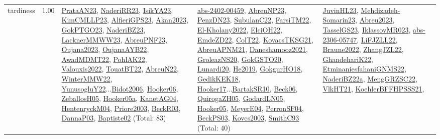 {\begin{longtable}{p{3cm}r>{\raggedright\arraybackslash}p{6cm}>{\raggedright\arraybackslash}p{6cm}>{\raggedright\arraybackslash}p{8cm}}
\index{tardiness}\index{Concepts!tardiness}tardiness &  1.00 & \hyperref[detail:PrataAN23]{PrataAN23}, \hyperref[detail:NaderiRR23]{NaderiRR23}, \hyperref[detail:IsikYA23]{IsikYA23}, \hyperref[detail:KimCMLLP23]{KimCMLLP23}, \hyperref[detail:AlfieriGPS23]{AlfieriGPS23}, \hyperref[detail:Akan2023]{Akan2023}, \hyperref[detail:GokPTGO23]{GokPTGO23}, \hyperref[detail:NaderiBZ23]{NaderiBZ23}, \hyperref[detail:LacknerMMWW23]{LacknerMMWW23}, \hyperref[detail:AbreuPNF23]{AbreuPNF23}, \hyperref[detail:Oujana2023]{Oujana2023}, \hyperref[detail:OujanaAYB22]{OujanaAYB22}, \hyperref[detail:AwadMDMT22]{AwadMDMT22}, \hyperref[detail:PohlAK22]{PohlAK22}, \hyperref[detail:Valouxis2022]{Valouxis2022}, \hyperref[detail:TouatBT22]{TouatBT22}, \hyperref[detail:AbreuN22]{AbreuN22}, \hyperref[detail:WinterMMW22]{WinterMMW22}, \hyperref[detail:YunusogluY22]{YunusogluY22}...\hyperref[detail:Bidot2006]{Bidot2006}, \hyperref[detail:Hooker06]{Hooker06}, \hyperref[detail:ZeballosH05]{ZeballosH05}, \hyperref[detail:Hooker05a]{Hooker05a}, \hyperref[detail:KanetAG04]{KanetAG04}, \hyperref[detail:HentenryckM04]{HentenryckM04}, \hyperref[detail:Priore2003]{Priore2003}, \hyperref[detail:BeckR03]{BeckR03}, \hyperref[detail:DannaP03]{DannaP03}, \hyperref[detail:Baptiste02]{Baptiste02} (Total: 83) & \hyperref[detail:abs-2402-00459]{abs-2402-00459}, \hyperref[detail:AbreuNP23]{AbreuNP23}, \hyperref[detail:PenzDN23]{PenzDN23}, \hyperref[detail:SubulanC22]{SubulanC22}, \hyperref[detail:FarsiTM22]{FarsiTM22}, \hyperref[detail:El-Kholany2022]{El-Kholany2022}, \hyperref[detail:ElciOH22]{ElciOH22}, \hyperref[detail:EmdeZD22]{EmdeZD22}, \hyperref[detail:ColT22]{ColT22}, \hyperref[detail:KovacsTKSG21]{KovacsTKSG21}, \hyperref[detail:AbreuAPNM21]{AbreuAPNM21}, \hyperref[detail:Daneshamooz2021]{Daneshamooz2021}, \hyperref[detail:GroleazNS20]{GroleazNS20}, \hyperref[detail:GokGSTO20]{GokGSTO20}, \hyperref[detail:Lunardi20]{Lunardi20}, \hyperref[detail:He2019]{He2019}, \hyperref[detail:GokgurHO18]{GokgurHO18}, \hyperref[detail:GedikKEK18]{GedikKEK18}, \hyperref[detail:Hooker17]{Hooker17}...\hyperref[detail:BartakSR10]{BartakSR10}, \hyperref[detail:Beck06]{Beck06}, \hyperref[detail:QuirogaZH05]{QuirogaZH05}, \hyperref[detail:GodardLN05]{GodardLN05}, \hyperref[detail:Hooker05]{Hooker05}, \hyperref[detail:MeyerE04]{MeyerE04}, \hyperref[detail:PerronSF04]{PerronSF04}, \hyperref[detail:BeckPS03]{BeckPS03}, \hyperref[detail:Kovcs2003]{Kovcs2003}, \hyperref[detail:SmithC93]{SmithC93} (Total: 40) & \hyperref[detail:JuvinHL23]{JuvinHL23}, \hyperref[detail:Mehdizadeh-Somarin23]{Mehdizadeh-Somarin23}, \hyperref[detail:Abreu2023]{Abreu2023}, \hyperref[detail:TasselGS23]{TasselGS23}, \hyperref[detail:IklassovMR023]{IklassovMR023}, \hyperref[detail:abs-2306-05747]{abs-2306-05747}, \hyperref[detail:LiFJZLL22]{LiFJZLL22}, \hyperref[detail:Braune2022]{Braune2022}, \hyperref[detail:ZhangJZL22]{ZhangJZL22}, \hyperref[detail:GhandehariK22]{GhandehariK22}, \hyperref[detail:EtminaniesfahaniGNMS22]{EtminaniesfahaniGNMS22}, \hyperref[detail:NaderiBZ22a]{NaderiBZ22a}, \hyperref[detail:MengGRZSC22]{MengGRZSC22}, \hyperref[detail:VlkHT21]{VlkHT21}, \hyperref[detail:KoehlerBFFHPSSS21]{KoehlerBFFHPSSS21}, 
\end{longtable}}
